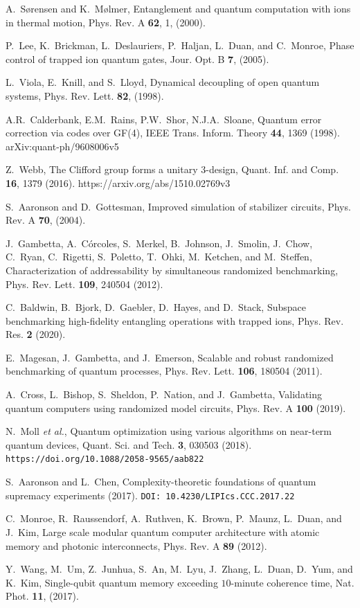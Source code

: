 \documentclass[12pt,a4paper]{amsart}
\numberwithin{equation}{section}
\theoremstyle{plain}
\theoremstyle{definition}
\begin{document}
\begin{thebibliography}{40}
A.~S\o rensen and K.~M\o lmer, Entanglement and quantum computation with ions
  in thermal motion, Phys. Rev. A \textbf{62}, 1, (2000).

P.~Lee, K.~Brickman, L.~Deslauriers, P.~Haljan, L.~Duan, and C.~Monroe, Phase control of trapped ion quantum gates, Jour. Opt. B \textbf{7}, (2005).

L.~Viola, E.~Knill, and S.~Lloyd, Dynamical decoupling of open quantum systems, Phys. Rev. Lett. \textbf{82}, (1998).

A.R.~Calderbank, E.M.~Rains, P.W.~Shor, N.J.A.~Sloane, Quantum error correction via codes over GF(4), IEEE Trans. Inform. Theory \textbf{44}, 1369 (1998). 
arXiv:quant-ph/9608006v5 

Z.~Webb,
The Clifford group forms a unitary $3$-design, Quant. Inf. and Comp. \textbf{16}, 1379 (2016). https://arxiv.org/abs/1510.02769v3

S.~Aaronson and D.~Gottesman, Improved simulation of stabilizer circuits, Phys. Rev. A \textbf{70}, (2004).

J.~Gambetta, A.~C\'orcoles, S.~Merkel, B.~Johnson, J.~Smolin, J.~Chow, C.~Ryan,
  C.~Rigetti, S.~Poletto, T.~Ohki, M.~Ketchen, and M.~Steffen,
  Characterization of addressability by simultaneous randomized
  benchmarking, Phys. Rev. Lett. \textbf{109}, 240504 (2012).

C.~Baldwin, B.~Bjork, D.~Gaebler, D.~Hayes, and D.~Stack, Subspace
  benchmarking high-fidelity entangling operations with trapped ions, Phys. Rev. Res. \textbf{2} (2020).

E.~Magesan, J.~Gambetta, and J.~Emerson, Scalable and robust randomized benchmarking of quantum processes, Phys. Rev. Lett. \textbf{106}, 180504 (2011).

A.~Cross, L.~Bishop, S.~Sheldon, P.~Nation, and J.~Gambetta, Validating quantum computers using randomized model circuits, Phys. Rev. A \textbf{100} (2019).
  
N.~Moll \textit{et al.},
Quantum optimization using various algorithms on near-term quantum devices, Quant. Sci. and Tech. \textbf{3}, 030503 (2018).
\texttt{https://doi.org/10.1088/2058-9565/aab822}

S.~Aaronson and L.~Chen, Complexity-theoretic foundations of quantum supremacy experiments (2017). \texttt{DOI: 10.4230/LIPIcs.CCC.2017.22}

C.~Monroe, R.~Raussendorf, A.~Ruthven, K.~Brown, P.~Maunz, L.~Duan, and J.~Kim, Large scale modular quantum computer architecture with atomic memory and photonic interconnects, Phys. Rev. A \textbf{89} (2012).

Y.~Wang, M.~Um, Z.~Junhua, S.~An, M.~Lyu, J.~Zhang, L.~Duan, D.~Yum, and K.~Kim, Single-qubit quantum memory exceeding $10$-minute coherence time, Nat. Phot. \textbf{11}, (2017).

\end{thebibliography}
\end{document}

